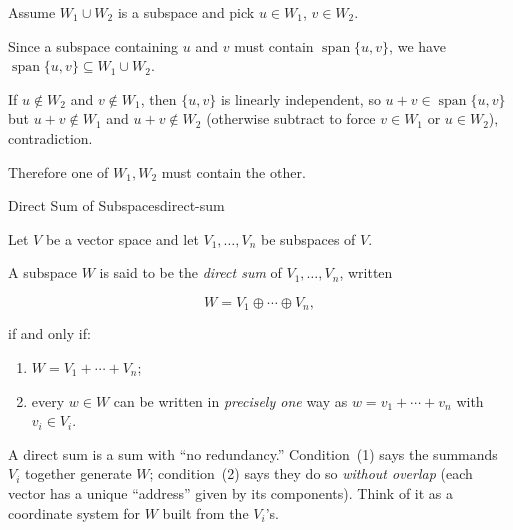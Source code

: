 \begin{extension}[title={Extension (Tutorial 1, Question 5, Method 2)}]

Assume $W_1\cup W_2$ is a subspace and pick $u\in W_1$, $v\in W_2$.

Since a subspace containing $u$ and $v$ must contain $\operatorname{span}\{u,v\}$, we have $\operatorname{span}\{u,v\}\subseteq W_1\cup W_2$.

If $u\notin W_2$ and $v\notin W_1$, then $\{u,v\}$ is linearly independent, so $u+v\in\operatorname{span}\{u,v\}$ but $u+v\notin W_1$ and $u+v\notin W_2$ (otherwise subtract to force $v\in W_1$ or $u\in W_2$), contradiction.

Therefore one of $W_1,W_2$ must contain the other.

\end{extension}




\begin{definition}{Direct Sum of Subspaces}{direct-sum}

Let $V$ be a vector space and let $V_1,\dots,V_n$ be subspaces of $V$.

A subspace $W$ is said to be the \emph{direct sum} of $V_1,\dots,V_n$, written

\[
W=V_1\oplus\cdots\oplus V_n,
\]

if and only if:

\begin{enumerate}[label=(\arabic*), leftmargin=*]

\item $W=V_1+\cdots+V_n$;

\item every $w\in W$ can be written in \emph{precisely one} way as $w=v_1+\cdots+v_n$ with $v_i\in V_i$.

\end{enumerate}

\end{definition}

A direct sum is a sum with ``no redundancy.''  Condition~(1) says the summands $V_i$ together generate $W$; condition~(2) says they do so \emph{without overlap} (each vector has a unique ``address'' given by its components).  Think of it as a coordinate system for $W$ built from the $V_i$'s.

